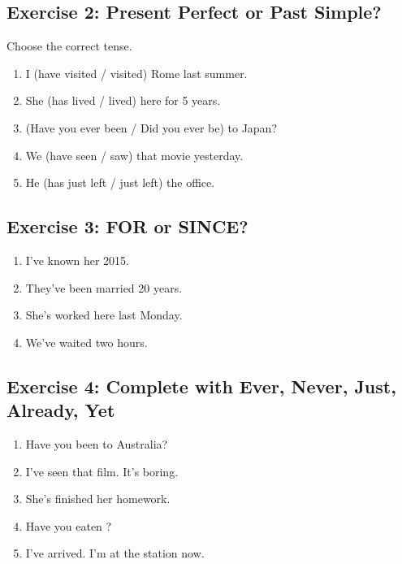 \subsection{Exercise 2: Present Perfect or Past Simple?}
Choose the correct tense.

\begin{enumerate}
    \item I (have visited / visited) Rome last summer.
    \item She (has lived / lived) here for 5 years.
    \item (Have you ever been / Did you ever be) to Japan?
    \item We (have seen / saw) that movie yesterday.
    \item He (has just left / just left) the office.
\end{enumerate}

\subsection{Exercise 3: FOR or SINCE?}
\begin{enumerate}
    \item I've known her \underline{\hspace{2cm}} 2015.
    \item They've been married \underline{\hspace{2cm}} 20 years.
    \item She's worked here \underline{\hspace{2cm}} last Monday.
    \item We've waited \underline{\hspace{2cm}} two hours.
\end{enumerate}

\subsection{Exercise 4: Complete with Ever, Never, Just, Already, Yet}
\begin{enumerate}
    \item Have you \underline{\hspace{2cm}} been to Australia?
    \item I've \underline{\hspace{2cm}} seen that film. It's boring.
    \item She's \underline{\hspace{2cm}} finished her homework.
    \item Have you eaten \underline{\hspace{2cm}}?
    \item I've \underline{\hspace{2cm}} arrived. I'm at the station now.
\end{enumerate}

